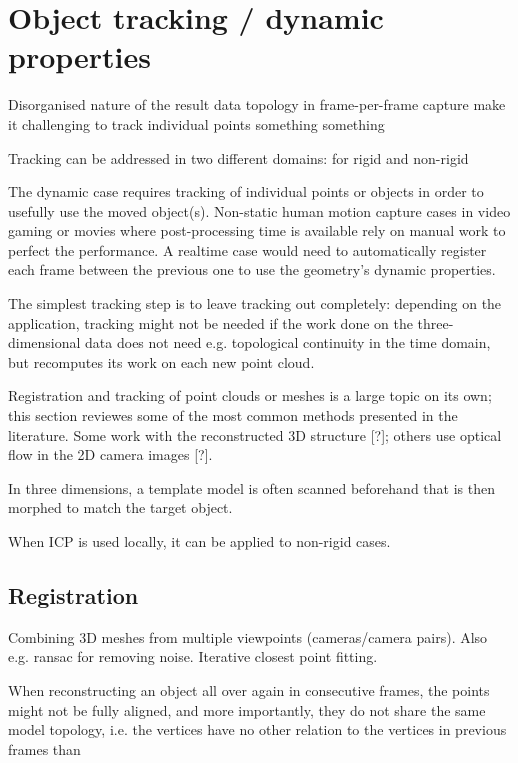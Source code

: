 \section{Object tracking / dynamic properties} \label{sec:tracking}

Disorganised nature of the result data topology in frame-per-frame capture make it challenging to track individual points something something


\cite{bojsen2012tracking}
\cite{li2009robust}

Tracking can be addressed in two different domains: for rigid and non-rigid 

The dynamic case requires tracking of individual points or objects in order to usefully use the moved object(s).
Non-static human motion capture cases in video gaming or movies where post-processing time is available rely on manual work to perfect the performance.
A realtime case would need to automatically register each frame between the previous one to use the geometry's dynamic properties.

The simplest tracking step is to leave tracking out completely: depending on the application, tracking might not be needed if the work done on the three-dimensional data does not need e.g. topological continuity in the time domain, but recomputes its work on each new point cloud.

Registration and tracking of point clouds or meshes is a large topic on its own; this section reviewes some of the most common methods presented in the literature. Some work with the reconstructed 3D structure [?]; others use optical flow in the 2D camera images [?].

In three dimensions, a template model is often scanned beforehand that is then morphed to match the target object.
\cite{bojsen2012tracking,li2009robust}

When ICP is used locally, it can be applied to non-rigid cases. \cite{brown2007global}

\subsection{Registration}

Combining 3D meshes from multiple viewpoints (cameras/camera pairs). Also e.g. ransac for removing noise. Iterative closest point fitting.

When reconstructing an object all over again in consecutive frames, the points might not be fully aligned, and more importantly, they do not share the same model topology, i.e. the vertices have no other relation to the vertices in previous frames than 

